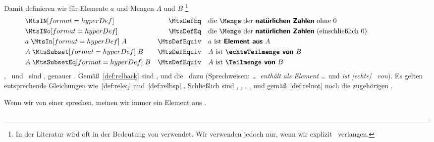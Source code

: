 Damit definieren wir für Elemente $a$ und Mengen $A$ und $B$%
\footnote{%
	In der Literatur wird \chrqt{\MtsSubset} oft in der Bedeutung von \chrqt{\MtsSubsetEq} verwendet.
	Wir verwenden \chrqt{\MtsSubset} jedoch nur, wenn wir explizit \Ungleichheit\ verlangen.
}
\begin{align}
	&   \defSym{\MtsIN}           & \MtsDefEq    \quad &
	\text{die \Menge\ der \defFt{natürlichen Zahlen}  ohne           $0$}
	\label{def:MtsIN}   \\
	&   \defSym{\MtsINo}          & \MtsDefEq    \quad &
	\text{die \Menge\ der \defFt{natürlichen Zahlen} (einschließlich $0$)}
	\label{def:MtsINo}  \\
	& a \defSymBin{\MtsIn}       A & \MtsDefEquiv \quad &
	\text{$a$ ist         \defFt{Element aus} $A$}
	\label{def:MtsIn} \\
	& A \defSymBin{\MtsSubset}   B & \MtsDefEquiv \quad &
	\text{$A$ ist \defFt{\echteTeilmenge\ von} $B$}
	\label{def:MtsSub}   \\
	& A \defSymBin{\MtsSubsetEq} B & \MtsDefEquiv \quad &
	\text{$A$ ist  \defFt     {\Teilmenge\ von} $B$}
	\label{def:MtsSubeq} \formulatoleft
\end{align}
\MtsIn, \MtsSubset\ und \MtsSubsetEq\ sind \Relationen, genauer .
Gemäß~\eqref{def:relback}  sind ,  und  die \Umkehrrelationen\ dazu (Sprechweisen: \emph{\dots\ enthält als Element \dots} und \emph{ist [echte] \Obermenge\ von}).
Es gelten entsprechende Gleichungen wie~\eqref{def:releq} und~\eqref{def:relbsp} .
Schließlich sind , , , ,  und  gemäß~\eqref{def:relnot}  noch die zugehörigen \Negationen.

Wenn wir von einer  sprechen, meinen wir immer ein Element aus \MtsINo.

\subsection[Bezeichnungen]{\Bezeichnungen}%
\label {sub:Bezeichnungen}


